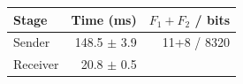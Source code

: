 \begin{tabular}{lrr}
\toprule
Stage & Time (ms) & $F_1{+}F_2$ / bits\\
\midrule
Sender & 148.5 $\pm$ 3.9 & 11+8 / 8320\\
Receiver & 20.8 $\pm$ 0.5 & \\
\bottomrule
\end{tabular}
